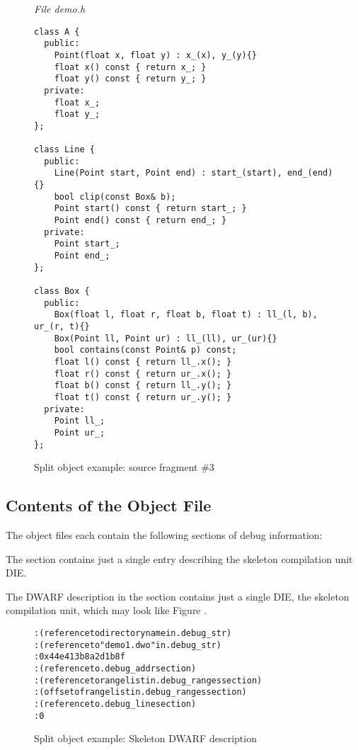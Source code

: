 \begin{figure}[h]
\textit{File demo.h}
\begin{lstlisting}
class A {
  public:
    Point(float x, float y) : x_(x), y_(y){}
    float x() const { return x_; }
    float y() const { return y_; }
  private:
    float x_;
    float y_;
};

class Line {
  public:
    Line(Point start, Point end) : start_(start), end_(end){}
    bool clip(const Box& b);
    Point start() const { return start_; }
    Point end() const { return end_; }
  private:
    Point start_;
    Point end_;
};

class Box {
  public:
    Box(float l, float r, float b, float t) : ll_(l, b), ur_(r, t){}
    Box(Point ll, Point ur) : ll_(ll), ur_(ur){}
    bool contains(const Point& p) const;
    float l() const { return ll_.x(); }
    float r() const { return ur_.x(); }
    float b() const { return ll_.y(); }
    float t() const { return ur_.y(); }
  private:
    Point ll_;
    Point ur_;
};

\end{lstlisting}
\caption{Split object example: source fragment \#3}
\label{fig:splitobjectexamplesourcefragment3}
\end{figure}

\clearpage
\subsection{Contents of the Object File}
The object files each contain the following sections of debug
information:
\begin{alltt}
  \dotdebugabbrev
  \dotdebuginfo
  \dotdebugranges
  \dotdebugline
  \dotdebugstr
  \dotdebugaddr
  \dotdebugnames
  \dotdebugaranges
\end{alltt}

The \dotdebugabbrev{} section contains just a single entry describing
the skeleton compilation unit DIE.

The DWARF description in the \dotdebuginfo{} section 
contains just a single DIE, the skeleton compilation unit, 
which may look like 
Figure .

\begin{figure}[h]
\begin{dwflisting}
\begin{alltt}

    \DWTAGcompileunit
      \DWATcompdir: (reference to directory name in .debug_str)
      \DWATdwoname: (reference to "demo1.dwo" in .debug_str)
      \DWATdwoid: 0x44e413b8a2d1b8f
      \DWATaddrbase: (reference to .debug_addr section)
      \DWATrangesbase: (reference to range list in .debug_ranges section)
      \DWATranges: (offset of range list in .debug_ranges section)
      \DWATstmtlist: (reference to .debug_line section)
      \DWATlowpc: 0
      
\end{alltt}
\end{dwflisting}
\caption{Split object example: Skeleton DWARF description}
\label{fig:splitdwafexampleskeletondwarfdescription}
\end{figure}

